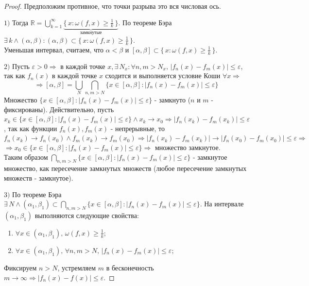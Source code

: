 \documentclass[12pt]{article}
\newcommand{\MR}{\mathbb{R}}
\newcommand{\VE}{\varepsilon}
\theoremstyle{definition}
\begin{document}
\begin{proof}
	Предположим противное, что точки разрыва это вся числовая ось.
	
	$1)$ Тогда $\MR = \bigcup\limits_{k=1}^{\infty}\underbrace{\{\,x \colon \omega(f,x) \geq \tfrac{1}{k} \,\}}_{\text{замкнутые}}$. По теореме Бэра $\exists \, k \wedge (\alpha, \beta) \colon (\alpha, \beta)\subset \{\,x \colon \omega(f,x) \geq \tfrac{1}{k} \,\}$. \\
	Уменьшая интервал, считаем, что $\alpha < \beta$ и $[\alpha,\beta] \subset \{\,x \colon \omega(f,x) \geq \tfrac{1}{k} \,\}$.
	
	$2)$ Пусть $\VE > 0 \Rightarrow$ в каждой точке $x, \exists \, N_x \colon \forall n,m > N_x, \, |f_n(x) - f_m(x)|\leq \VE$, так как $f_n(x)$ в каждой точке $x$ сходится и выполняется условие Коши $\forall x \Rightarrow$
	$$\Rightarrow [\alpha,\beta] = \bigcup\limits_{N}\bigcap\limits_{n,m > N}\Big\{x \in [\alpha, \beta]\colon |f_n(x) - f_m(x)| \leq \VE\Big\}$$
	Множество $\{x \in [\alpha, \beta]\colon |f_n(x) - f_m(x)| \leq \VE\}$ - замкнуто ($n$ и $m$ - фиксированы). Действительно, пусть $x_k \in \{x \in [\alpha, \beta]\colon |f_n(x) - f_m(x)| \leq \VE\} \wedge x_k \to x_0 \Rightarrow |f_n(x_k) - f_m(x_k)| \leq \VE$, так как функции $f_n(x), f_m(x)$ - непрерывные, то $f_n(x_k) \to f_n(x_0) \wedge f_m(x_k) \to f_m(x_0) \Rightarrow |f_n(x_k) - f_m(x_k)| \to |f_n(x_0) - f_m(x_0)| \leq \VE \Rightarrow$\\
	$\Rightarrow x_0 \in \{x \in [\alpha, \beta]\colon |f_n(x) - f_m(x)| \leq \VE\} \Rightarrow$ множество замкнутое. \\
	Таким образом $\bigcap\limits_{n,m > N}\{x \in [\alpha, \beta]\colon |f_n(x) - f_m(x)| \leq \VE\}$ - замкнутое множество, как пересечение замкнутых множеств (любое пересечение замкнутых множеств - замкнутое).
	
	$3)$ По теореме Бэра $\exists \, N \wedge (\alpha_1,\beta_1) \subset \bigcap\limits_{n,m > N}\{x \in [\alpha, \beta]\colon |f_n(x) - f_m(x)| \leq \VE\}$. На интервале $(\alpha_1, \beta_1)$ выполняются следующие свойства:
	\begin{enumerate}[label={(\arabic*)}]
		\item $\forall x \in (\alpha_1,\beta_1), \, \omega(f,x) \geq \frac{1}{k}$;
		\item $\forall x \in (\alpha_1,\beta_1), \, \forall n,m > N, \, |f_n(x) - f_m(x)| \leq \VE$;
	\end{enumerate}
	Фиксируем $n > N$, устремляем $m$ в бесконечность $m \to \infty \Rightarrow |f_n(x) - f(x)| \leq \VE$. 
	

\end{proof}
\end{document}
